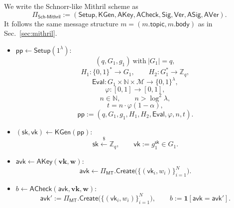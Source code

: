 \documentclass{article}
\newcommand{\pp}[0]{\mathsf{pp}}
\newcommand{\sk}[0]{\mathsf{sk}}
\newcommand{\vk}[0]{\mathsf{vk}}
\newcommand{\avk}[0]{\mathsf{avk}}
\newcommand{\topic}[0]{\mathsf{topic}}
\newcommand{\getsr}{\xleftarrow{\$}}
\begin{document}
We write the Schnorr-like Mithril scheme as
\[
  \Pi_{\mathsf{Sch\text{-}Mithril}} := (\mathsf{Setup}, \mathsf{KGen}, \mathsf{AKey}, \mathsf{ACheck}, \mathsf{Sig}, \mathsf{Ver}, \mathsf{ASig}, \mathsf{AVer}).
\]
It follows the same message structure $m=(m.\topic,m.\mathsf{body})$ as in Sec.~\ref{sec:mithril}.
\begin{itemize}

  \item $\pp \leftarrow \mathsf{Setup}(1^\lambda)$:
        \[
          (q,G_1,g_1)\ \text{with}\ |G_1|=q,
        \]
        \[
          H_1:\{0,1\}^\ast\to G_1,\qquad H_2:G_1^*\to \mathbb{Z}_q,
        \]
        \[
          \mathsf{Eval}:G_1\times\mathbb{N}\times\mathcal{M}\to\{0,1\}^\lambda,
        \]
        \[
          \varphi:[0,1]\to[0,1],
        \]
        \[
          n\in\mathbb{N},\qquad n>\log^2\lambda,
        \]
        \[
          t=n\cdot\varphi(1-\alpha),
        \]
        \[
          \pp:=(q,G_1,g_1,H_1,H_2,\mathsf{Eval},\varphi,n,t).
        \]

  \item $(\sk,\vk)\leftarrow \mathsf{KGen}(\pp)$:
        \[
          \sk\getsr \mathbb{Z}_q,\qquad \vk:=g_1^{\sk}\in G_1.
        \]

  \item $\avk\leftarrow \mathsf{AKey}(\mathbf{vk},\mathbf{w})$:
        \[
          \avk\leftarrow \Pi_{\mathsf{MT}}.\mathsf{Create}\bigl(\{(\vk_i,w_i)\}_{i=1}^{N}\bigr).
        \]

  \item $b\leftarrow \mathsf{ACheck}(\avk,\mathbf{vk},\mathbf{w})$:
        \[
          \avk':=\Pi_{\mathsf{MT}}.\mathsf{Create}\bigl(\{(\vk_i,w_i)\}_{i=1}^{N}\bigr),
        \qquad
          b:=\mathbf{1}[\avk=\avk'].
        \]


\end{itemize}
\end{document}

